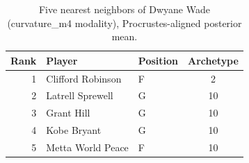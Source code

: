 \begin{table}[htbp]
  \centering\small
  \begin{tabular}{rllc}
    \toprule
    Rank & Player & Position & Archetype \\
    \midrule
    1 & Clifford Robinson & F & 2 \\
    2 & Latrell Sprewell & G & 10 \\
    3 & Grant Hill & G & 10 \\
    4 & Kobe Bryant & G & 10 \\
    5 & Metta World Peace & F & 10 \\
    \bottomrule
  \end{tabular}
  \caption{Five nearest neighbors of Dwyane Wade (curvature_m4 modality), Procrustes-aligned posterior mean.}
  \label{tab:Dwyane_Wade_neighbors_curvature_m4}
\end{table}

